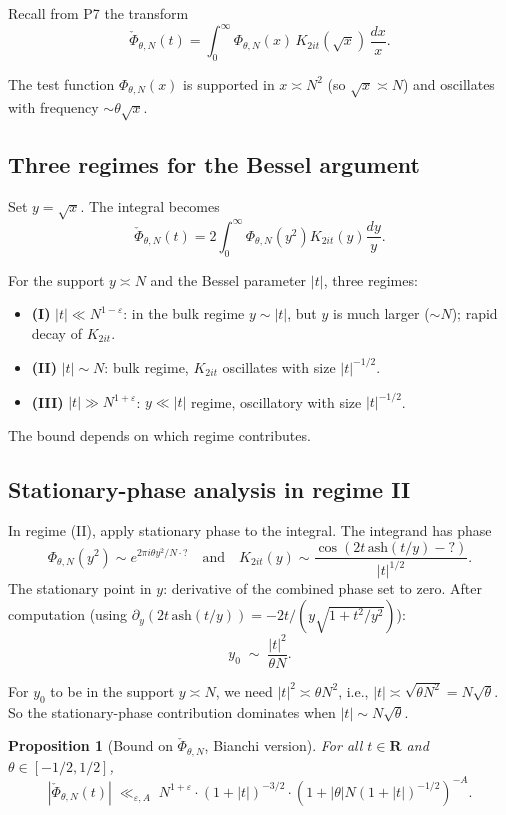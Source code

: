 \documentclass[11pt]{article}
\newtheorem{proposition}[theorem]{Proposition}
\theoremstyle{definition}
\newcommand{\R}{\mathbf{R}}
\begin{document}
Recall from P7 the transform
\[
\check\Phi_{\theta,N}(t)=\int_0^\infty\Phi_{\theta,N}(x)\,K_{2it}(\sqrt x)\,\frac{dx}{x}.
\]

The test function $\Phi_{\theta,N}(x)$ is supported in $x\asymp N^2$ (so $\sqrt x\asymp N$) and oscillates with frequency $\sim\theta\sqrt x$.

\subsection{Three regimes for the Bessel argument}

Set $y=\sqrt x$. The integral becomes
\[
\check\Phi_{\theta,N}(t)=2\int_0^\infty\Phi_{\theta,N}(y^2)K_{2it}(y)\frac{dy}{y}.
\]

For the support $y\asymp N$ and the Bessel parameter $|t|$, three regimes:
\begin{itemize}
\item \textbf{(I)} $|t|\ll N^{1-\varepsilon}$: in the bulk regime $y\sim|t|$, but $y$ is much larger ($\sim N$); rapid decay of $K_{2it}$.
\item \textbf{(II)} $|t|\sim N$: bulk regime, $K_{2it}$ oscillates with size $|t|^{-1/2}$.
\item \textbf{(III)} $|t|\gg N^{1+\varepsilon}$: $y\ll|t|$ regime, oscillatory with size $|t|^{-1/2}$.
\end{itemize}

The bound depends on which regime contributes.

\subsection{Stationary-phase analysis in regime II}

In regime (II), apply stationary phase to the integral. The integrand has phase
\[
\Phi_{\theta,N}(y^2)\sim e^{2\pi i\theta y^2/N\cdot ?}\quad\text{and}\quad K_{2it}(y)\sim\frac{\cos(2t\,\mathrm{ash}(t/y)-?)}{|t|^{1/2}}.
\]
The stationary point in $y$: derivative of the combined phase set to zero. After computation (using $\partial_y(2t\,\mathrm{ash}(t/y))=-2t/(y\sqrt{1+t^2/y^2})$):
\[
y_0\;\sim\;\frac{|t|^2}{\theta N}.
\]

For $y_0$ to be in the support $y\asymp N$, we need $|t|^2\asymp\theta N^2$, i.e., $|t|\asymp\sqrt{\theta N^2}=N\sqrt\theta$. So the stationary-phase contribution dominates when $|t|\sim N\sqrt\theta$.

\begin{proposition}[Bound on $\check\Phi_{\theta,N}$, Bianchi version]\label{prop:check-Phi-bound}
For all $t\in\R$ and $\theta\in[-1/2,1/2]$,
\[
|\check\Phi_{\theta,N}(t)|\;\ll_{\varepsilon,A}\;N^{1+\varepsilon}\cdot(1+|t|)^{-3/2}\cdot(1+|\theta|N(1+|t|)^{-1/2})^{-A}.
\]
\end{proposition}
\end{document}
